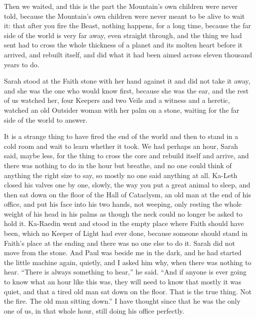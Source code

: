 \ornament

Then we waited, and this is the part the Mountain's own children were never told, because the Mountain's own children were never meant to be alive to wait it: that after you fire the Beast, nothing happens, for a long time, because the far side of the world is very far away, even straight through, and the thing we had sent had to cross the whole thickness of a planet and its molten heart before it arrived, and rebuilt itself, and did what it had been aimed across eleven thousand years to do.\par

Sarah stood at the Faith stone with her hand against it and did not take it away, and she was the one who would know first, because she was the ear, and the rest of us watched her, four Keepers and two Veils and a witness and a heretic, watched an old Outsider woman with her palm on a stone, waiting for the far side of the world to answer.\par

It is a strange thing to have fired the end of the world and then to stand in a cold room and wait to learn whether it took. We had perhaps an hour, Sarah said, maybe less, for the thing to cross the core and rebuild itself and arrive, and there was nothing to do in the hour but breathe, and no one could think of anything the right size to say, so mostly no one said anything at all. Ka-Leth closed his valves one by one, slowly, the way you put a great animal to sleep, and then sat down on the floor of the Hall of Cataclysm, an old man at the end of his office, and put his face into his two hands, not weeping, only resting the whole weight of his head in his palms as though the neck could no longer be asked to hold it. Ka-Raedin went and stood in the empty place where Faith should have been, which no Keeper of Light had ever done, because someone should stand in Faith's place at the ending and there was no one else to do it. Sarah did not move from the stone. And Paul was beside me in the dark, and he had started the little machine again, quietly, and I asked him why, when there was nothing to hear. ``There is always something to hear,'' he said. ``And if anyone is ever going to know what an hour like this was, they will need to know that mostly it was quiet, and that a tired old man sat down on the floor. That is the true thing. Not the fire. The old man sitting down.'' I have thought since that he was the only one of us, in that whole hour, still doing his office perfectly.\par

